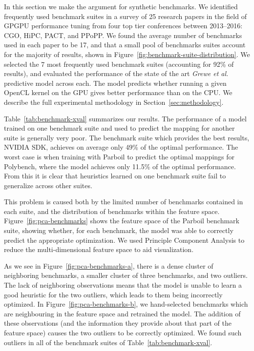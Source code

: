 In this section we make the argument for synthetic benchmarks. We identified frequently used benchmark suites in a survey of 25 research papers in the field of GPGPU performance tuning from four top tier conferences between 2013--2016: CGO, HiPC, PACT, and PPoPP. We found the average number of benchmarks used in each paper to be 17, and that a small pool of benchmarks suites account for the majority of results, shown in Figure~\ref{fig:benchmark-suite-distribution}. We selected the 7 most frequently used benchmark suites (accounting for 92\% of results), and evaluated the performance of the state of the art \emph{Grewe et al.}~\cite{Grewe2013} predictive model across each. The model predicts whether running a given OpenCL kernel on the GPU gives better performance than on the CPU. We describe the full experimental methodology in Section~\ref{sec:methodology}.

Table~\ref{tab:benchmark-xval} summarizes our results. The performance of a model trained on one benchmark suite and used to predict the mapping for another suite is generally very poor. The benchmark suite which provides the best results, NVIDIA SDK, achieves on average only 49\% of the optimal performance. The worst case is when training with Parboil to predict the optimal mappings for Polybench, where the model achieves only 11.5\% of the optimal performance. From this it is clear that heuristics learned on one benchmark suite fail to generalize across other suites.

This problem is caused both by the limited number of benchmarks contained in each suite, and the distribution of benchmarks within the feature space. Figure~\ref{fig:pca-benchmarks} shows the feature space of the Parboil benchmark suite, showing whether, for each benchmark, the model was able to correctly predict the appropriate optimization. We used Principle Component Analysis to reduce the multi-dimensional feature space to aid visualization.

As we see in Figure~\ref{fig:pca-benchmarks-a}, there is a dense cluster of neighboring benchmarks, a smaller cluster of three benchmarks, and two outliers. The lack of neighboring observations means that the model is unable to learn a good heuristic for the two outliers, which leads to them being incorrectly optimized. In Figure~\ref{fig:pca-benchmarks-b}, we hand-selected benchmarks which are neighbouring in the feature space and retrained the model. The addition of these observations (and the information they provide about that part of the feature space) causes the two outliers to be correctly optimized. We found such outliers in all of the benchmark suites of Table~\ref{tab:benchmark-xval}.

